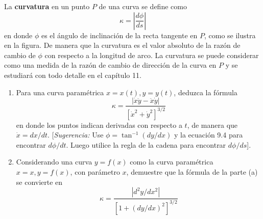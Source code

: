 \item La \textbf{curvatura} en un punto $P$ de una curva se define como
    \[ \kappa = \left| \frac{d\phi}{ds} \right| \]
    en donde $\phi$ es el ángulo de inclinación de la recta tangente en $P$, como se ilustra en la figura. De manera que la curvatura es el valor absoluto de la razón de cambio de $\phi$ con respecto a la longitud de arco. La curvatura se puede considerar como una medida de la razón de cambio de dirección de la curva en $P$ y se estudiará con todo detalle en el capítulo 11.
    
    \begin{center}
    \end{center}
    
    \begin{enumerate}
        \item[(a)] Para una curva paramétrica $x = x(t), y = y(t)$, deduzca la fórmula
        \[ \kappa = \frac{|\dot{x}\ddot{y} - \ddot{x}\dot{y}|}{[\dot{x}^2 + \dot{y}^2]^{3/2}} \]
        en donde los puntos indican derivadas con respecto a $t$, de manera que $\dot{x} = dx/dt$. [\textit{Sugerencia:} Use $\phi = \tan^{-1}(dy/dx)$ y la ecuación 9.4 para encontrar $d\phi/dt$. Luego utilice la regla de la cadena para encontrar $d\phi/ds$].
        
        \item[(b)] Considerando una curva $y = f(x)$ como la curva paramétrica $x = x, y = f(x)$, con parámetro $x$, demuestre que la fórmula de la parte (a) se convierte en
        \[ \kappa = \frac{|d^2y/dx^2|}{[1 + (dy/dx)^2]^{3/2}} \]
    \end{enumerate}
